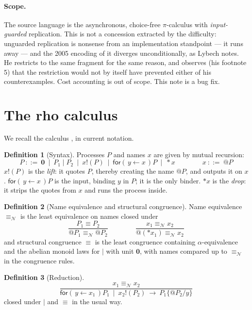 \documentclass[11pt]{article}
\makeatletter
\theoremstyle{definition}
\newtheorem{definition}{Definition}[section]
\theoremstyle{plain}
\theoremstyle{remark}
\newcommand{\quo}[1]{@#1}
\newcommand{\drp}[1]{{*}#1}
\newcommand{\inp}[3]{\mathsf{for}(\,#1 \leftarrow #2\,)#3}
\newcommand{\out}[2]{#1!(#2)}
\newcommand{\nequiv}{\equiv_{\mathcal{N}}}
\newcommand{\nil}{\mathbf{0}}
\makeatother
\begin{document}
\paragraph{Scope.}
The source language is the asynchronous, choice-free $\pi$-calculus with
\emph{input-guarded} replication. This is not a concession extracted by
the difficulty: unguarded replication is nonsense from an implementation
standpoint --- it runs away --- and the 2005 encoding of it diverges
unconditionally, as Lybech notes. He restricts to the same fragment for
the same reason, and observes (his footnote 5) that the restriction would
not by itself have prevented either of his counterexamples. Cost
accounting is out of scope. This note is a bug fix.

\section{The rho calculus}\label{sec:rho}

We recall the calculus \cite{MeredithRadestock05}, in current notation.

\begin{definition}[Syntax]
Processes $P$ and names $x$ are given by mutual recursion:
\[
P \ ::=\ \nil \ \mid\ P_1 \mid P_2 \ \mid\ \out{x}{P} \ \mid\ \inp{y}{x}{P}
      \ \mid\ \drp{x}
\qquad\qquad
x \ ::=\ \quo{P}
\]
$\out{x}{P}$ is the \emph{lift}: it quotes $P$, thereby creating the name
$\quo{P}$, and outputs it on $x$. $\inp{y}{x}{P}$ is the input, binding
$y$ in $P$; it is the only binder. $\drp{x}$ is the \emph{drop}: it
strips the quotes from $x$ and runs the process inside.
\end{definition}

\begin{definition}[Name equivalence and structural congruence]
Name equivalence $\nequiv$ is the least equivalence on names closed under
\[
\frac{P_1 \equiv P_2}{\quo{P_1} \nequiv \quo{P_2}}
\qquad\qquad
\frac{x_1 \nequiv x_2}{\quo{(\drp{x_1})} \nequiv x_2}
\]
and structural congruence $\equiv$ is the least congruence containing
$\alpha$-equivalence and the abelian monoid laws for $\mid$ with unit
$\nil$, with names compared up to $\nequiv$ in the congruence rules.
\end{definition}

\begin{definition}[Reduction]
\[
\frac{x_1 \nequiv x_2}
     {\inp{y}{x_1}{P_1} \ \mid\ \out{x_2}{P_2} \ \to\ P_1\{\quo{P_2}/y\}}
\]
closed under $\mid$ and $\equiv$ in the usual way.
\end{definition}
\end{document}
